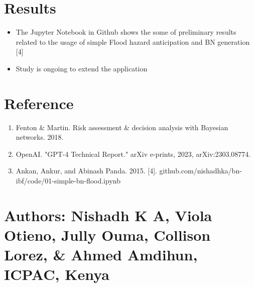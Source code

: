 \documentclass[a0paper,fleqn]{betterposter}
\begin{document}
{	    \section{Results}
		\begin{itemize}
			\item The Jupyter Notebook in Github shows the some of preliminary results related to the usage of simple Flood hazard anticipation and BN generation [4] 			
			\item Study is ongoing to extend the application
		\end{itemize}
		\section{Reference}
		\begin{enumerate}
		\item Fenton \& Martin. Risk assessment \& decision analysis with Bayesian networks. 2018.
		\item OpenAI. "GPT-4 Technical Report." arXiv e-prints, 2023, arXiv:2303.08774.
		\item Ankan, Ankur, and Abinash Panda. 2015. [4]. github.com/nishadhka/bn-ibf/code/01-simple-bn-flood.ipynb 
		
		
	    \end{enumerate}
		\section{Authors: Nishadh K A, Viola Otieno, Jully Ouma, Collison Lorez, \& Ahmed Amdihun, ICPAC, Kenya}
	}	
	{
		
	}
	
\end{document}
